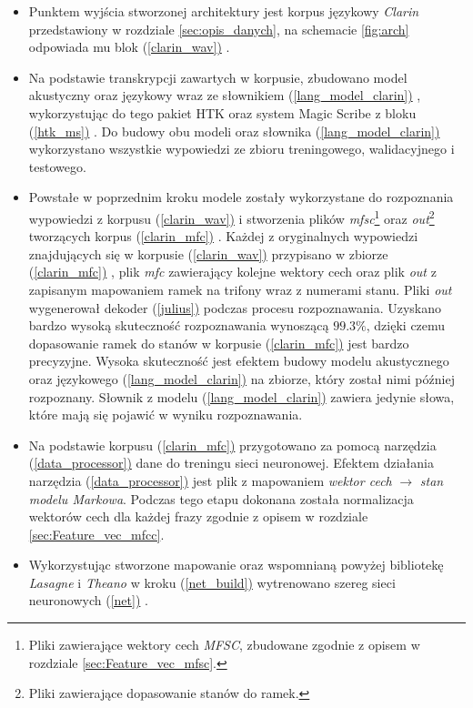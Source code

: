 \documentclass[shortabstract, mgr]{iithesis}
\newcommand{\refBlock}[1]{(\hyperref[#1]{\ref*{#1})}
}
\begin{document}
	\begin{itemize}
		\item Punktem wyjścia stworzonej architektury jest korpus językowy \textit{Clarin} przedstawiony w rozdziale \ref{sec:opis_danych}, na schemacie \ref{fig:arch} odpowiada mu blok \refBlock{clarin_wav}.
		
		\item Na podstawie transkrypcji zawartych w korpusie, zbudowano model akustyczny oraz językowy wraz ze słownikiem \refBlock{lang_model_clarin}, wykorzystując do tego pakiet HTK oraz system Magic Scribe z bloku \refBlock{htk_ms}. Do budowy obu modeli oraz słownika \refBlock{lang_model_clarin} wykorzystano wszystkie wypowiedzi ze zbioru treningowego, walidacyjnego i testowego.
		
		\item  Powstałe w poprzednim kroku modele zostały wykorzystane do rozpoznania wypowiedzi z korpusu \refBlock{clarin_wav} i stworzenia plików \textit{mfsc}\footnote{Pliki zawierające wektory cech \textit{MFSC}, zbudowane zgodnie z opisem w rozdziale \ref{sec:Feature_vec_mfsc}.} oraz \textit{out}\footnote{Pliki zawierające dopasowanie stanów do ramek.} tworzących korpus \refBlock{clarin_mfc}. Każdej z oryginalnych wypowiedzi znajdujących się w korpusie \refBlock{clarin_wav} przypisano w zbiorze \refBlock{clarin_mfc}, plik \textit{mfc} zawierający kolejne wektory cech oraz plik \textit{out} z zapisanym mapowaniem ramek na trifony wraz z numerami stanu. Pliki \textit{out} wygenerował dekoder \refBlock{julius} podczas procesu rozpoznawania. Uzyskano bardzo wysoką skuteczność rozpoznawania wynoszącą $99.3\%$, dzięki czemu dopasowanie ramek do stanów w korpusie \refBlock{clarin_mfc} jest bardzo precyzyjne. Wysoka skuteczność jest efektem budowy modelu akustycznego oraz językowego \refBlock{lang_model_clarin} na zbiorze, który został nimi później rozpoznany.  Słownik z modelu \refBlock{lang_model_clarin} zawiera jedynie słowa, które mają się pojawić w wyniku rozpoznawania.
		
		\item  Na podstawie korpusu \refBlock{clarin_mfc} przygotowano za pomocą narzędzia \refBlock{data_processor} dane do treningu sieci neuronowej. Efektem działania narzędzia \refBlock{data_processor} jest plik z mapowaniem \textit{wektor cech} $\longrightarrow$ \textit{stan modelu Markowa}. Podczas tego etapu dokonana została normalizacja wektorów cech dla każdej frazy zgodnie z opisem w rozdziale \ref{sec:Feature_vec_mfcc}.
		
		\item  Wykorzystując stworzone mapowanie oraz wspomnianą powyżej bibliotekę \textit{Lasagne} i \textit{Theano} w kroku \refBlock{net_build} wytrenowano szereg sieci neuronowych \refBlock{net}.
		

\end{itemize}
\end{document}
